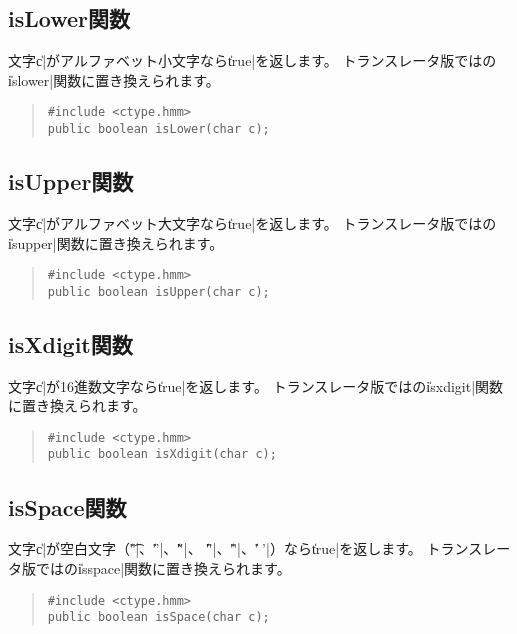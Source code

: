 \subsection{isLower関数}

文字\|c|がアルファベット小文字なら\|true|を返します。
トランスレータ版では\cl の\|islower|関数に置き換えられます。

\begin{quote}
\begin{verbatim}
#include <ctype.hmm>
public boolean isLower(char c);
\end{verbatim}
\end{quote}

\subsection{isUpper関数}

文字\|c|がアルファベット大文字なら\|true|を返します。
トランスレータ版では\cl の\|isupper|関数に置き換えられます。

\begin{quote}
\begin{verbatim}
#include <ctype.hmm>
public boolean isUpper(char c);
\end{verbatim}
\end{quote}

\subsection{isXdigit関数}

文字\|c|が16進数文字なら\|true|を返します。
トランスレータ版では\cl の\|isxdigit|関数に置き換えられます。

\begin{quote}
\begin{verbatim}
#include <ctype.hmm>
public boolean isXdigit(char c);
\end{verbatim}
\end{quote}

\subsection{isSpace関数}

文字\|c|が空白文字（\|'\t'|、\|'\n'|、\|'\v'|、
\|'\f'|、\|'\r'|、\|' '|）なら\|true|を返します。
トランスレータ版では\cl の\|isspace|関数に置き換えられます。

\begin{quote}
\begin{verbatim}
#include <ctype.hmm>
public boolean isSpace(char c);
\end{verbatim}
\end{quote}

